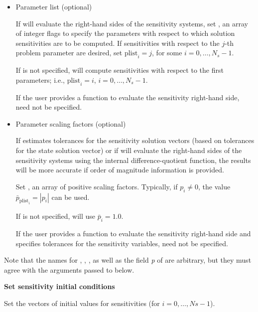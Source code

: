 \begin{Steps}
\begin{itemize}
    \item Parameter list (optional)

      If {\idas} will evaluate the right-hand sides of the sensitivity 
      systems, set , an array of  integer flags to specify the 
      parameters  with respect to which solution sensitivities are to be computed.
      If sensitivities with respect to the $j$-th problem parameter are desired, set
      ${\text{plist}}_i = j$, for some $i=0,\ldots,N_s-1$.

      If  is not specified, {\idas} will compute sensitivities with respect
      to the first  parameters; i.e., ${\text{plist}}_i = i$, $i=0,\ldots,N_s-1$.

      If the user provides a function to evaluate the sensitivity right-hand side,
       need not be specified.

    \item Parameter scaling factors (optional)

      If {\idas} estimates tolerances for the sensitivity solution vectors (based
      on tolerances for the state solution vector) or if {\idas} will evaluate 
      the right-hand sides of the sensitivity systems using the internal difference-quotient
      function, the results will be more accurate if order of magnitude information is provided.

      Set , an array of  positive scaling factors. Typically,
      if $p_i \ne 0$, the value ${\bar p}_{\text{plist}_i} = |p_i|$ can be used.

      If  is not specified, {\idas} will use ${\bar p}_i = 1.0$.

      If the user provides a function to evaluate the sensitivity right-hand side and specifies
      tolerances for the sensitivity variables,  need not be specified.

    \end{itemize}

    Note that the names for , , , as well as the field
    {\em p} of  are arbitrary, but they must agree with the arguments
    passed to  below.

\item
  {\bf Set sensitivity initial conditions}

  Set the  vectors  of  initial values
  for sensitivities (for $i=0,\ldots,Ns-1$). 


\end{Steps}
